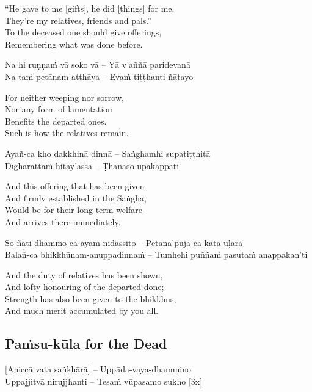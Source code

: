 \begin{english}
  ``He gave to me [gifts], he did [things] for me.\\
  They're my relatives, friends and pals.''\\
  To the deceased one should give offerings,\\
  Remembering what was done before.
\end{english}

Na hi ruṇṇaṁ vā soko vā – Yā v'aññā paridevanā\\
Na taṁ petānam-atthāya – Evaṁ tiṭṭhanti ñātayo

\begin{english}
  For neither weeping nor sorrow,\\
  Nor any form of lamentation\\
  Benefits the departed ones.\\
  Such is how the relatives remain.
\end{english}

Ayañ-ca kho dakkhinā dinnā – Saṅghamhi supatiṭṭhitā\\
Dīgharattaṁ hitāy'assa – Ṭhānaso upakappati

\begin{english}
  And this offering that has been given\\
  And firmly established in the Saṅgha,\\
  Would be for their long-term welfare\\
  And arrives there immediately.
\end{english}

So ñāti-dhammo ca ayaṁ nidassito – Petāna'pūjā ca katā uḷārā\\
Balañ-ca bhikkhūnam-anuppadinnaṁ – Tumhehi puññaṁ pasutaṁ anappakan'ti

\begin{english}
  And the duty of relatives has been shown,\\
  And lofty honouring of the departed done;\\
  Strength has also been given to the bhikkhus,\\
  And much merit accumulated by you all.
\end{english}

\suttaRef{[Khp 7]}

\subsection{Paṁsu-kūla for the Dead}
\label{pamsu-kula-dead}
[Aniccā vata saṅkhārā] – Uppāda-vaya-dhammino\\
Uppajjitvā nirujjhanti – Tesaṁ vūpasamo sukho \hfill{[3x]}

